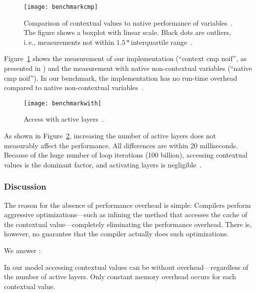 \begin{figure}[htp]
\centering
\texttt{[image: benchmarkcmp]}
\caption[Comparison with contextual values.]{Comparison of contextual values to native performance of variables~\cite{raab2014program}.
The figure shows a boxplot with linear scale.
Black dots are outliers, i.\,e., measurements not within $1.5*$interquartile range~\cite{raab2015global}.}
\label{fig:benchmarkcmp}
\end{figure}

Figure~\ref{fig:benchmarkcmp} shows the measurement of our implementation (``context cmp noif'', as presented in ) and the measurement with native non-contextual variables (``native cmp noif'').
In our benchmark, the implementation has no run-time overhead compared to native non-contextual variables~\cite{raab2014program}.

\begin{figure}[htp]
\centering
\texttt{[image: benchmarkwith]}
\caption[Access with active layers.]{Access with active layers~\cite{raab2014program}.}
\label{fig:benchmarkwith}
\end{figure}


As shown in Figure~\ref{fig:benchmarkwith}, increasing the number of active layers does not measurably affect the performance.
All differences are within 20 milliseconds.
Because of the huge number of loop iterations (100 billion), accessing contextual values is the dominant factor, and activating layers is negligible~\cite{raab2014program}.

\subsubsection{Discussion}

The reason for the absence of performance overhead is simple:
Compilers perform aggressive optimizations---such as inlining the method that accesses the cache of the contextual value---completely eliminating the performance overhead.
There is, however, no guarantee that the compiler actually does such optimizations.

We answer :
\rqEvaluationFrontendPerformance*

\begin{finding}
In our model accessing contextual values can be without overhead---regardless of the number of active layers.
Only constant memory overhead occurs for each contextual value.
\end{finding}

